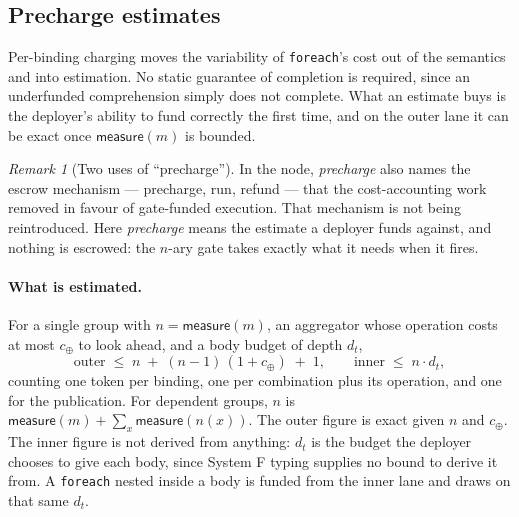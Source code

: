 \documentclass[11pt]{article}
\theoremstyle{definition}
\theoremstyle{plain}
\theoremstyle{remark}
\newtheorem{remark}[definition]{Remark}
\newcommand{\meas}{\mathsf{measure}}
\newcommand{\fe}{\texttt{foreach}}
\begin{document}
\subsection{Precharge estimates}
\label{sec:precharge}

Per-binding charging moves the variability of \fe{}'s cost out of the semantics
and into estimation. No static guarantee of completion is required, since an
underfunded comprehension simply does not complete. What an estimate buys is
the deployer's ability to fund correctly the first time, and on the outer lane
it can be exact once \(\meas(m)\) is bounded.

\begin{remark}[Two uses of ``precharge'']
In the node, \emph{precharge} also names the escrow mechanism --- precharge,
run, refund --- that the cost-accounting work removed in favour of
gate-funded execution. That mechanism is not being reintroduced. Here
\emph{precharge} means the estimate a deployer funds against, and nothing is
escrowed: the \(n\)-ary gate takes exactly what it needs when it
fires.
\end{remark}

\paragraph{What is estimated.} For a single group with \(n = \meas(m)\), an
aggregator whose operation costs at most \(c_\oplus\) to look ahead, and a body
budget of depth \(d_t\),
\[
\text{outer} \;\le\; n \;+\; (n-1)\,(1 + c_\oplus) \;+\; 1,
\qquad
\text{inner} \;\le\; n \cdot d_t ,
\]
counting one token per binding, one per combination plus its operation, and
one for the publication. For dependent groups, \(n\) is
\(\meas(m) + \sum_x \meas(n(x))\). The outer figure is exact given \(n\) and
\(c_\oplus\). The inner figure is not derived from anything: \(d_t\) is the
budget the deployer chooses to give each body, since System F typing supplies
no bound to derive it from. A \fe{} nested inside a body is funded from the
inner lane and draws on that same \(d_t\).
\end{document}

